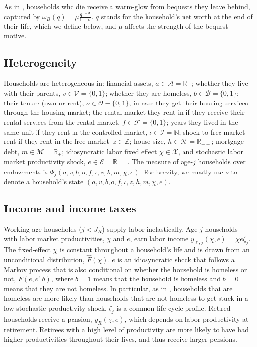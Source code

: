 \documentclass[parskip=full]{article}
\begin{document}
As in \citet{cagetti-denardi-2006}, households who die receive a warm-glow from bequests they leave behind, captured by $\omega_{B}(q)=\mu \frac{q^{1-\sigma}}{1-\sigma}$. $q$ stands for the household's net worth at the end of their life, which we define below, and $\mu$ affects the strength of the bequest motive.

\subsection{Heterogeneity}

Households are heterogeneous in: financial assets, $a\in \mathcal{A}=\mathbb{R}_+$; whether they live with their parents, $v\in \mathcal{V}=\{0,1\}$; whether they are homeless, $b \in \mathcal{B}=\{0,1\}$; their tenure (own or rent), $o \in \mathcal{O}=\{0,1\}$, in case they get their housing services through the housing market; the rental market they rent in if they receive their rental services from the rental market, $f \in \mathcal{F}=\{0,1\}$; years they lived in the same unit if they rent in the controlled market, $\iota \in \mathcal{I}=\mathbb{N}$; shock to free market rent if they rent in the free market, $z \in \mathbb{Z}$; house size, $h\in \mathcal{H}=\mathbb{R}_{++}$; mortgage debt, $m \in \mathcal{M}=\mathbb{R}_+$; idiosyncratic labor fixed effect $\chi \in \mathcal{X}$, and stochastic labor market productivity shock, $e \in \mathcal{E} = \mathbb{R}_{++}$. The measure of age-$j$ households over endowments is $\Psi_{j}(a,v,b,o,f,\iota,z,h,m,\chi,e)$. For brevity, we mostly use $s$ to denote a household's state $(a,v,b,o,f,\iota,z,h,m,\chi,e)$.

\subsection{Income and income taxes}\label{subsection:income}

Working-age households ($j<J_{R}$) supply labor inelastically. Age-$j$ households with labor market productivities, $\chi$ and $e$, earn labor income $y_{\ell,j}(\chi,e)=\chi e\zeta_j$. The fixed-effect $\chi$ is constant throughout a household's life and is drawn from an unconditional distribution, $\hat{F}(\chi)$. $e$ is an idiosyncratic shock that follows a Markov process that is also conditional on whether the household is homeless or not, $F(e,e'|b)$, where $b=1$ means that the household is homeless and $b=0$ means that they are not homeless. In particular, as in \citet{az-2024}, households that are homeless are more likely than households that are not homeless to get stuck in a low stochastic productivity shock. $\zeta_j$ is a common life-cycle profile. Retired households receive a pension, $y_{R}(\chi,e)$, which depends on labor productivity at retirement. Retirees with a high level of productivity are more likely to have had higher productivities throughout their lives, and thus receive larger pensions. 
\end{document}
